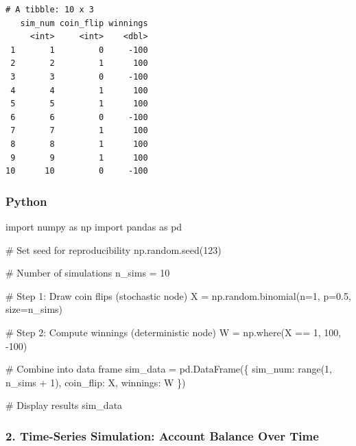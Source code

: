 \documentclass[
  letterpaper,
  DIV=11,
  numbers=noendperiod]{scrartcl}
\newenvironment{Shaded}{\begin{snugshade}}{\end{snugshade}}
\newcommand{\BuiltInTok}[1]{\textcolor[rgb]{0.00,0.23,0.31}{#1}}
\newcommand{\CommentTok}[1]{\textcolor[rgb]{0.37,0.37,0.37}{#1}}
\newcommand{\DecValTok}[1]{\textcolor[rgb]{0.68,0.00,0.00}{#1}}
\newcommand{\FloatTok}[1]{\textcolor[rgb]{0.68,0.00,0.00}{#1}}
\newcommand{\ImportTok}[1]{\textcolor[rgb]{0.00,0.46,0.62}{#1}}
\newcommand{\NormalTok}[1]{\textcolor[rgb]{0.00,0.23,0.31}{#1}}
\newcommand{\OperatorTok}[1]{\textcolor[rgb]{0.37,0.37,0.37}{#1}}
\newcommand{\StringTok}[1]{\textcolor[rgb]{0.13,0.47,0.30}{#1}}
\theoremstyle{definition}
\theoremstyle{remark}
\begin{document}
\begin{verbatim}
# A tibble: 10 x 3
   sim_num coin_flip winnings
     <int>     <int>    <dbl>
 1       1         0     -100
 2       2         1      100
 3       3         0     -100
 4       4         1      100
 5       5         1      100
 6       6         0     -100
 7       7         1      100
 8       8         1      100
 9       9         1      100
10      10         0     -100
\end{verbatim}

\subsubsection{Python}

\begin{Shaded}
\begin{Highlighting}[]
\ImportTok{import}\NormalTok{ numpy }\ImportTok{as}\NormalTok{ np}
\ImportTok{import}\NormalTok{ pandas }\ImportTok{as}\NormalTok{ pd}

\CommentTok{\# Set seed for reproducibility}
\NormalTok{np.random.seed(}\DecValTok{123}\NormalTok{)}

\CommentTok{\# Number of simulations}
\NormalTok{n\_sims }\OperatorTok{=} \DecValTok{10}

\CommentTok{\# Step 1: Draw coin flips (stochastic node)}
\NormalTok{X }\OperatorTok{=}\NormalTok{ np.random.binomial(n}\OperatorTok{=}\DecValTok{1}\NormalTok{, p}\OperatorTok{=}\FloatTok{0.5}\NormalTok{, size}\OperatorTok{=}\NormalTok{n\_sims)}

\CommentTok{\# Step 2: Compute winnings (deterministic node)}
\NormalTok{W }\OperatorTok{=}\NormalTok{ np.where(X }\OperatorTok{==} \DecValTok{1}\NormalTok{, }\DecValTok{100}\NormalTok{, }\OperatorTok{{-}}\DecValTok{100}\NormalTok{)}

\CommentTok{\# Combine into data frame}
\NormalTok{sim\_data }\OperatorTok{=}\NormalTok{ pd.DataFrame(\{}
    \StringTok{\textquotesingle{}sim\_num\textquotesingle{}}\NormalTok{: }\BuiltInTok{range}\NormalTok{(}\DecValTok{1}\NormalTok{, n\_sims }\OperatorTok{+} \DecValTok{1}\NormalTok{),}
    \StringTok{\textquotesingle{}coin\_flip\textquotesingle{}}\NormalTok{: X,}
    \StringTok{\textquotesingle{}winnings\textquotesingle{}}\NormalTok{: W}
\NormalTok{\})}

\CommentTok{\# Display results}
\NormalTok{sim\_data}
\end{Highlighting}
\end{Shaded}

\subsubsection{2. Time-Series Simulation: Account Balance Over
Time}\label{time-series-simulation-account-balance-over-time}
\end{document}
